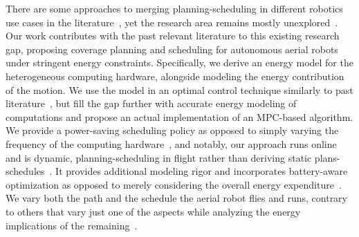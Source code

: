 There are some approaches to merging planning-scheduling in different robotics use cases in the literature~\citep{mei2005case,mei2006deployment,brateman2006energy,zhang2007low,sadrpour2013experimental,sadrpour2013mission,ondruska2015scheduled,lahijanian2018resource,sudhakar2020balancing}, yet the research area remains mostly unexplored~\citep{sudhakar2020balancing,brateman2006energy}. Our work contributes with the past relevant literature to this existing research gap, proposing coverage planning and scheduling for autonomous aerial robots under stringent energy constraints. Specifically, we derive an energy model for the heterogeneous computing hardware, alongside modeling the energy contribution of the motion. We use the model in an optimal control technique similarly to past literature~\citep{zhang2007low,ondruska2015scheduled,lahijanian2018resource,brateman2006energy}, but fill the gap further with accurate energy modeling of computations and propose an actual implementation of an MPC-based algorithm. We provide a power-saving scheduling policy as opposed to simply varying the frequency of the computing hardware~\citep{zhang2007low,brateman2006energy}, and notably, our approach runs online and is dynamic, planning-scheduling in flight rather than deriving static plans-schedules~\citep{lahijanian2018resource}. It provides additional modeling rigor and incorporates battery-aware optimization as opposed to merely considering the overall energy expenditure~\citep{sudhakar2020balancing}. We vary both the path and the schedule the aerial robot flies and runs, contrary to others that vary just one of the aspects while analyzing the energy implications of the remaining~\citep{ondruska2015scheduled}.

